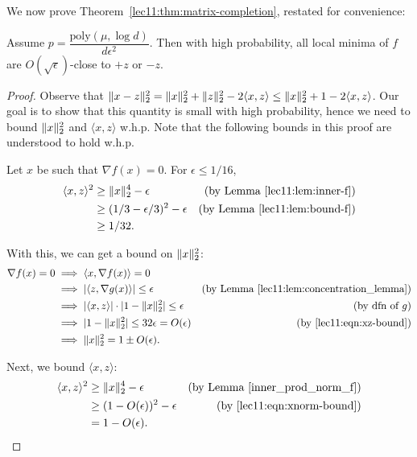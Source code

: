 We now prove Theorem~\ref{lec11:thm:matrix-completion}, restated for convenience:
\begin{theorem}
Assume $p = \dfrac{\textrm{poly}(\mu, \log d)}{d\epsilon^2}$. Then with high probability, all local minima of $f$ are $O(\sqrt{\epsilon})$-close to $+z$ or $-z$.
\end{theorem}

\begin{proof}
Observe that $\|x-z\|_2^2 = \|x\|_2^2 + \|z\|_2^2 - 2\langle x,z \rangle \leq \|x\|_2^2 + 1 - 2\langle x,z \rangle$. Our goal is to show that this quantity is small with high probability, hence we need to bound $\|x\|_2^2$ and $\langle x,z \rangle$ w.h.p. Note that the following bounds in this proof are understood to hold w.h.p.
    
Let $x$ be such that $\nabla f(x) = 0$. For $\epsilon \leq 1/16$,
\begin{align}
\langle x,z \rangle^2 &\geq \|x\|_2^4 - \epsilon &\text{(by Lemma~\ref{lec11:lem:inner-f})} \\
&\geq (1/3-\epsilon/3)^2 - \epsilon &\text{(by Lemma~\ref{lec11:lem:bound-f})} \\
&\geq 1/32. \label{lec11:eqn:xz-bound}
\end{align}

With this, we can get a bound on $\|x\|_2^2$:
\begin{align}
\nabla f(x) = 0 &\implies \langle x, \nabla f(x) \rangle = 0 \\
&\implies |\langle z, \nabla g(x) \rangle| \leq \epsilon & \text{(by Lemma \ref{lec11:lem:concentration_lemma})} \\
&\implies |\langle x,z\rangle| \cdot |1-\|x\|_2^2| \leq \epsilon &\text{(by dfn of $g$)} \\
&\implies |1-\|x\|_2^2| \leq 32\epsilon = O(\epsilon) &\text{(by \eqref{lec11:eqn:xz-bound})} \\
&\implies \|x\|_2^2 = 1 \pm O(\epsilon). \label{lec11:eqn:xnorm-bound}
\end{align}
    
Next, we bound $\langle x,z \rangle$:
\begin{align}
\langle x, z \rangle^2 &\geq \|x\|_2^4 - \epsilon &\text{(by Lemma \ref{inner_prod_norm_f})} \\
&\geq (1-O(\epsilon))^2 - \epsilon &\text{(by \eqref{lec11:eqn:xnorm-bound})} \\
&= 1 - O(\epsilon).
\end{align}


\end{proof}
